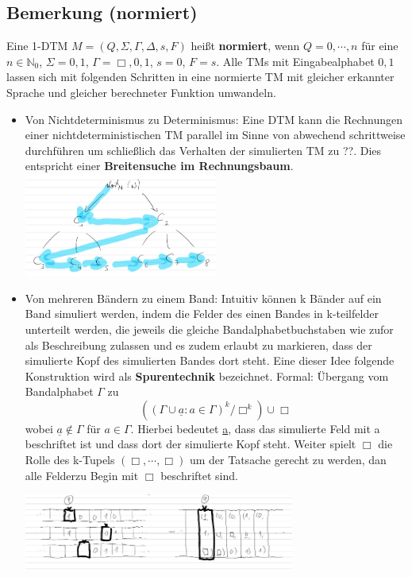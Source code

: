 \documentclass[a4paper,11pt]{article}
\begin{document}
\subsection{Bemerkung (normiert)} Eine 1-DTM $M = (Q, \Sigma, \Gamma, \Delta, s, F)$ heißt \textbf{normiert}, wenn $Q = {0,\cdots, n}$ für eine $n \in \mathbb{N}_{0}$, $\Sigma = {0, 1}$, $\Gamma = {\Box, 0, 1}$, $s = 0$, $F = {s}$. Alle TMs mit Eingabealphabet ${0,1}$ lassen sich mit folgenden Schritten in eine normierte TM mit gleicher erkannter Sprache und gleicher berechneter Funktion umwandeln. 
\begin{itemize}
  \item Von Nichtdeterminismus zu Determinismus: Eine DTM kann die Rechnungen einer nichtdeterministischen TM parallel im Sinne von abwechend schrittweise durchführen um schließlich das Verhalten der simulierten TM zu ??. Dies entspricht einer \textbf{Breitensuche im Rechnungsbaum}. 
  \includegraphics[width=0.5\textwidth]{breitensuche.png} 

  \item Von mehreren Bändern zu einem Band: Intuitiv können k Bänder auf ein Band simuliert werden, indem die Felder des einen Bandes in k-teilfelder unterteilt werden, die jeweils die gleiche Bandalphabetbuchstaben wie zufor als Beschreibung zulassen und es zudem erlaubt zu markieren, dass der simulierte Kopf des simulierten Bandes dort steht. Eine dieser Idee folgende Konstruktion wird als \textbf{Spurentechnik} bezeichnet. Formal: Übergang vom Bandalphabet $\Gamma$ zu \[((\Gamma \cup{\underline{a} : a \in \Gamma})^{k}/{\Box}^{k}) \cup {\Box}\] 
  wobei $\underline{a} \not \in \Gamma$ für $a \in \Gamma$. Hierbei bedeutet \underline{a}, dass das simulierte Feld mit a beschriftet ist und dass dort der simulierte Kopf steht. Weiter spielt $\Box$ die Rolle des k-Tupels $(\Box, \cdots, \Box)$ um der Tatsache gerecht zu werden, dan alle Felderzu Begin mit $\Box$ beschriftet sind.
  
  \includegraphics[width=0.7\textwidth]{n_zu_1_band.png}


\end{itemize}
\end{document}
